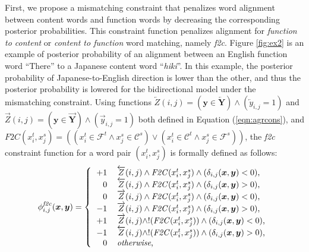 \documentclass[english]{jnlp_1.4}
\begin{document}
First, we propose a mismatching constraint that penalizes word alignment between content words and function words by decreasing the corresponding posterior probabilities.
This constraint function penalizes alignment for \textit{function to content} or \textit{content to function} word matching, namely \textit{f2c}.
Figure \ref{fig:ex2} is an example of posterior probability of an alignment between an English function word ``There'' to a Japanese content word ``\textit{hiki}''.
In this example, the posterior probability of Japanese-to-English direction is lower than the other, and thus the posterior probability is lowered for the bidirectional model under the mismatching constraint.
Using functions $\overleftarrow{Z}(i,j)=(\boldsymbol{y} \in \overleftarrow{\boldsymbol{Y}}) \land (\overleftarrow{y}_{i,j}=1)$ and $\overrightarrow{Z}(i,j)=(\boldsymbol{y} \in \overrightarrow{\boldsymbol{Y}}) \land (\overrightarrow{y}_{i,j}=1)$ both defined in Equation (\ref{eqn:agrcons}), and  $\mathit{F2C}(x^t_i, x^s_j) = ((x^t_i \in \mathcal{F}^t \land x^s_j \in \mathcal{C}^s) \lor (x^t_i \in \mathcal{C}^t \land x^s_j \in \mathcal{F}^s))$,
the \textit{f2c} constraint function for a word pair $(x^t_i, x^s_j)$ is formally defined as follows:
\begin{equation}
 \label{eqn:decrease}
\phi^{\mathit{f2c}}_{i,j}(\boldsymbol{x},\boldsymbol{y}) = \left\{
  \begin{tabular}{rl}
  $+1$ & $\overleftarrow{Z}(i,j) \land \mathit{F2C}(x^t_i, x^s_j) \land (\delta_{i,j}(\boldsymbol{x}, \boldsymbol{y}) < 0 )$, \\
  $0$   & $\overleftarrow{Z}(i,j) \land \mathit{F2C}(x^t_i, x^s_j) \land (\delta_{i,j}(\boldsymbol{x}, \boldsymbol{y}) > 0 ) $, \\
  $0$   & $\overrightarrow{Z}(i,j) \land \mathit{F2C}(x^t_i, x^s_j) \land (\delta_{i,j}(\boldsymbol{x}, \boldsymbol{y}) < 0 )$, \\
  $-1$  & $\overrightarrow{Z}(i,j) \land \mathit{F2C}(x^t_i, x^s_j) \land (\delta_{i,j}(\boldsymbol{x}, \boldsymbol{y}) > 0 )$, \\
  $+1$ & $\overrightarrow{Z}(i,j) \land !(\mathit{F2C}(x^t_i, x^s_j)) \land (\delta_{i,j}(\boldsymbol{x}, \boldsymbol{y}) < 0 )$, \\
  $-1$  & $\overleftarrow{Z}(i,j) \land !(\mathit{F2C}(x^t_i, x^s_j)) \land (\delta_{i,j}(\boldsymbol{x}, \boldsymbol{y}) > 0 ) $, \\
  $0$   & \textit{otherwise}, \\
  \end{tabular}
 \right.
\end{equation}
\end{document}
